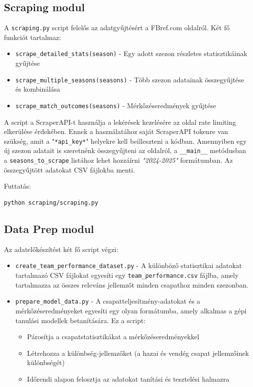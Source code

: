 \subsection{Scraping modul}

A \texttt{scraping.py} script felelős az adatgyűjtésért a FBref.com oldalról. Két fő funkciót tartalmaz:

\begin{itemize}
    \item \texttt{scrape\_detailed\_stats(season)} - Egy adott szezon részletes statisztikáinak gyűjtése
    \item \texttt{scrape\_multiple\_seasons(seasons)} - Több szezon adatainak összegyűjtése és kombinálása
    \item \texttt{scrape\_match\_outcomes(seasons)} - Mérkőzéseredmények gyűjtése
\end{itemize}

A script a ScraperAPI-t használja a lekérések kezelésére az oldal rate limiting elkerülése érdekében. Ennek a használatához saját ScraperAPI tokenre van szükség, amit a "\texttt{*api\_key*}" helyekre kell beilleszteni a kódban.
Amennyiben egy új szezon adatait is szeretnénk összegyűjteni az oldalról, a \texttt{\_\_main\_\_} metódusban a \texttt{seasons\_to\_scrape} listához lehet hozzáírni \textit{"2024-2025"} formátumban.
Az összegyűjtött adatokat CSV fájlokba menti.

Futtatás:
\begin{lstlisting}[language=bash]
    python scraping/scraping.py
\end{lstlisting}

\subsection{Data Prep modul}

Az adatelőkészítést két fő script végzi:

\begin{itemize}
    

\item\texttt{create\_team\_performance\_dataset.py} - A különböző statisztikai adatokat tartalmazó CSV fájlokat egyesíti egy \texttt{team\_performance.csv} fájlba, amely tartalmazza az összes releváns jellemzőt minden csapathoz minden szezonban.

\item\texttt{prepare\_model\_data.py} - A csapatteljesítmény-adatokat és a mérkőzéseredményeket egyesíti egy olyan formátumba, amely alkalmas a gépi tanulási modellek betanítására. Ez a script:
    \begin{itemize}
        \item Párosítja a csapatstatisztikákat a mérkőzéseredményekkel
        \item Létrehozza a különbség-jellemzőket (a hazai és vendég csapat jellemzőinek különbségét)
        \item Időrendi alapon felosztja az adatokat tanítási és tesztelési halmazra
    \end{itemize}
\end{itemize}

